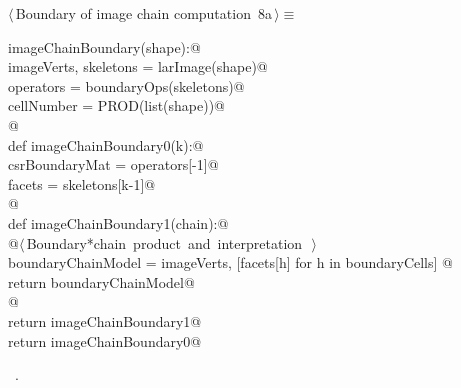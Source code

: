 \documentclass[11pt,oneside]{article}	%
\begin{document}
\begin{flushleft} \small
\begin{minipage}{\linewidth} \label{scrap12}
\protect{}$\langle\,$Boundary of image chain computation\nobreak\ {\footnotesize 8a}$\,\rangle\equiv$
\vspace{-1ex}
\begin{list}{}{} \item
\mbox{}\verb@def imageChainBoundary(shape):@\\
\mbox{}\verb@   imageVerts, skeletons = larImage(shape)@\\
\mbox{}\verb@   operators = boundaryOps(skeletons)@\\
\mbox{}\verb@   cellNumber = PROD(list(shape))@\\
\mbox{}\verb@   @\\
\mbox{}\verb@   def imageChainBoundary0(k):@\\
\mbox{}\verb@      csrBoundaryMat = operators[-1]@\\
\mbox{}\verb@      facets = skeletons[k-1]@\\
\mbox{}\verb@      @\\
\mbox{}\verb@      def imageChainBoundary1(chain):@\\
\mbox{}\verb@         @\hbox{$\langle\,$Boundary*chain product and interpretation\nobreak\ {\footnotesize {}}$\,\rangle$}\verb@@\\
\mbox{}\verb@         boundaryChainModel = imageVerts, [facets[h] for h in boundaryCells]     @\\
\mbox{}\verb@         return boundaryChainModel@\\
\mbox{}\verb@      @\\
\mbox{}\verb@      return imageChainBoundary1@\\
\mbox{}\verb@   return imageChainBoundary0@\\
\mbox{}\verb@@{\NWsep}
\end{list}
\vspace{-1ex}
\footnotesize\addtolength{\baselineskip}{-1ex}
\begin{list}{}{\setlength{\itemsep}{-\parsep}\setlength{\itemindent}{-\leftmargin}}
\item \NWtxtMacroRefIn\ .
\end{list}
\end{minipage}\\[4ex]
\end{flushleft}
\end{document}
